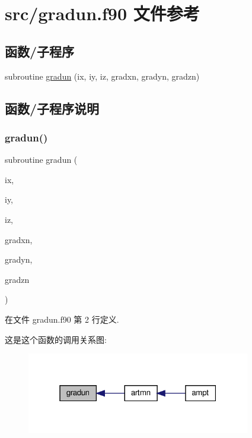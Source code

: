\hypertarget{gradun_8f90}{}\section{src/gradun.f90 文件参考}
\label{gradun_8f90}
\subsection*{函数/子程序}
\begin{DoxyCompactItemize}
\item 
subroutine \mbox{\hyperlink{gradun_8f90_a3d932a78c8a3ba4eeb7dc849661d117b}{gradun}} (ix, iy, iz, gradxn, gradyn, gradzn)
\end{DoxyCompactItemize}


\subsection{函数/子程序说明}
\mbox{\label{gradun_8f90_a3d932a78c8a3ba4eeb7dc849661d117b}} 
\subsubsection{\texorpdfstring{gradun()}{gradun()}}
{\footnotesize\ttfamily subroutine gradun (\begin{DoxyParamCaption}\item[{}]{ix,  }\item[{}]{iy,  }\item[{}]{iz,  }\item[{}]{gradxn,  }\item[{}]{gradyn,  }\item[{}]{gradzn }\end{DoxyParamCaption})}



在文件 gradun.\+f90 第 2 行定义.

这是这个函数的调用关系图\+:
\nopagebreak
\begin{figure}[H]
\begin{center}
\leavevmode
\includegraphics[width=277pt]{gradun_8f90_a3d932a78c8a3ba4eeb7dc849661d117b_icgraph}
\end{center}
\end{figure}
